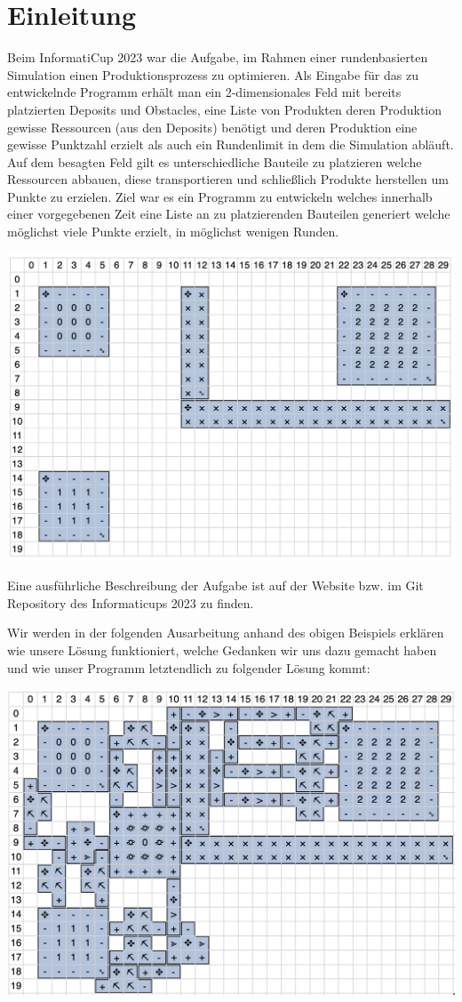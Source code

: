 \documentclass[12pt,a4paper]{article}
\begin{document}
\section{Einleitung}
Beim InformatiCup 2023 war die Aufgabe, im Rahmen einer rundenbasierten Simulation einen Produktionsprozess zu optimieren. Als Eingabe für das zu entwickelnde Programm erhält man ein 2-dimensionales Feld mit bereits platzierten Deposits und Obstacles, eine Liste von Produkten deren Produktion gewisse Ressourcen (aus den Deposits) benötigt und deren Produktion eine gewisse Punktzahl erzielt als auch ein Rundenlimit in dem die Simulation abläuft. Auf dem besagten Feld gilt es unterschiedliche Bauteile zu platzieren welche Ressourcen abbauen, diese transportieren und schließlich Produkte herstellen um Punkte zu erzielen. Ziel war es ein Programm zu entwickeln welches innerhalb einer vorgegebenen Zeit eine Liste an zu platzierenden Bauteilen generiert welche möglichst viele Punkte erzielt, in möglichst wenigen Runden.


\includegraphics[width=\textwidth]{task1.png}

Eine ausführliche Beschreibung der Aufgabe ist auf der Website bzw. im Git Repository des Informaticups 2023 zu finden.

Wir werden in der folgenden Ausarbeitung anhand des obigen Beispiels erklären wie unsere Lösung funktioniert, welche Gedanken wir uns dazu gemacht haben und wie unser Programm letztendlich zu folgender Lösung kommt:

\includegraphics[width=\textwidth]{task1_solution.png}
\end{document}
